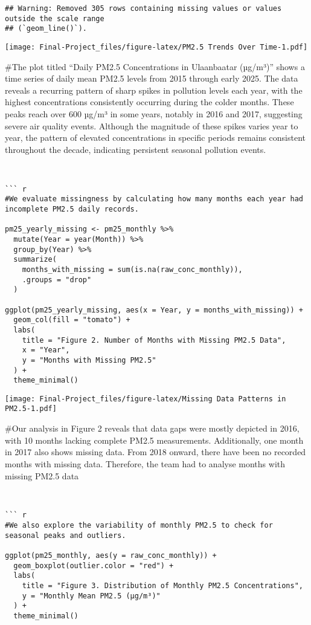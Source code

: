 \documentclass[
]{article}
\begin{document}
\begin{verbatim}
## Warning: Removed 305 rows containing missing values or values outside the scale range
## (`geom_line()`).
\end{verbatim}

\texttt{[image: Final-Project\_files/figure-latex/PM2.5 Trends Over Time-1.pdf]}

\#The plot titled ``Daily PM2.5 Concentrations in Ulaanbaatar (µg/m³)''
shows a time series of daily mean PM2.5 levels from 2015 through early
2025. The data reveals a recurring pattern of sharp spikes in pollution
levels each year, with the highest concentrations consistently occurring
during the colder months. These peaks reach over 600 µg/m³ in some
years, notably in 2016 and 2017, suggesting severe air quality events.
Although the magnitude of these spikes varies year to year, the pattern
of elevated concentrations in specific periods remains consistent
throughout the decade, indicating persistent seasonal pollution events.

\begin{verbatim}


``` r
#We evaluate missingness by calculating how many months each year had incomplete PM2.5 daily records.

pm25_yearly_missing <- pm25_monthly %>%
  mutate(Year = year(Month)) %>%
  group_by(Year) %>%
  summarize(
    months_with_missing = sum(is.na(raw_conc_monthly)),
    .groups = "drop"
  )

ggplot(pm25_yearly_missing, aes(x = Year, y = months_with_missing)) +
  geom_col(fill = "tomato") +
  labs(
    title = "Figure 2. Number of Months with Missing PM2.5 Data",
    x = "Year",
    y = "Months with Missing PM2.5"
  ) +
  theme_minimal()
\end{verbatim}

\texttt{[image: Final-Project\_files/figure-latex/Missing Data Patterns in PM2.5-1.pdf]}

\#Our analysis in Figure 2 reveals that data gaps were mostly depicted
in 2016, with 10 months lacking complete PM2.5 measurements.
Additionally, one month in 2017 also shows missing data. From 2018
onward, there have been no recorded months with missing data. Therefore,
the team had to analyse months with missing PM2.5 data

\begin{verbatim}


``` r
#We also explore the variability of monthly PM2.5 to check for seasonal peaks and outliers.

ggplot(pm25_monthly, aes(y = raw_conc_monthly)) +
  geom_boxplot(outlier.color = "red") +
  labs(
    title = "Figure 3. Distribution of Monthly PM2.5 Concentrations",
    y = "Monthly Mean PM2.5 (µg/m³)"
  ) +
  theme_minimal()
\end{verbatim}
\end{document}
